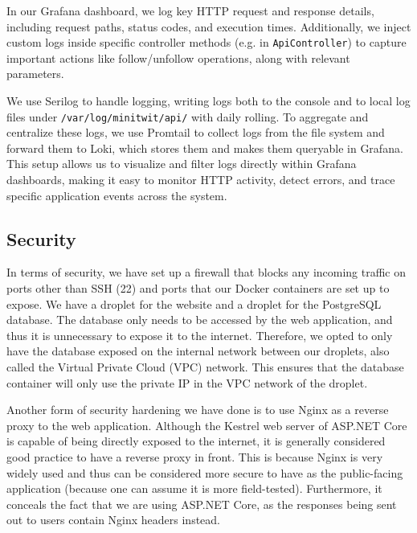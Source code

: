 \documentclass[12pt,a4paper,reqno]{report}
\begin{document}
In our Grafana dashboard, we log key HTTP request and response details, including request paths, status codes, and execution times. Additionally, we inject custom logs inside specific controller methods (e.g. in \texttt{ApiController}) to capture important actions like follow/unfollow operations, along with relevant parameters.

We use Serilog to handle logging, writing logs both to the console and to local log files under \texttt{/var/log/minitwit/api/} with daily rolling. To aggregate and centralize these logs, we use Promtail to collect logs from the file system and forward them to Loki, which stores them and makes them queryable in Grafana. This setup allows us to visualize and filter logs directly within Grafana dashboards, making it easy to monitor HTTP activity, detect errors, and trace specific application events across the system.

\subsection{Security}
\label{sec:security}

In terms of security, we have set up a firewall that blocks any incoming traffic on ports other than SSH (22) and ports that our Docker containers are set up to expose. We have a droplet for the website and a droplet for the PostgreSQL database. The database only needs to be accessed by the web application, and thus it is unnecessary to expose it to the internet. Therefore, we opted to only have the database exposed on the internal network between our droplets, also called the Virtual Private Cloud (VPC) network. This ensures that the database container will only use the private IP in the VPC network of the droplet.

Another form of security hardening we have done is to use Nginx as a reverse proxy to the web application. Although the Kestrel web server of ASP.NET Core is capable of being directly exposed to the internet, it is generally considered good practice to have a reverse proxy in front. This is because Nginx is very widely used and thus can be considered more secure to have as the public-facing application (because one can assume it is more field-tested). Furthermore, it conceals the fact that we are using ASP.NET Core, as the responses being sent out to users contain Nginx headers instead.
\end{document}

